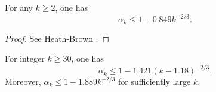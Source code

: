 \begin{lemma}\label{hb-alpha-large}
For any $k \ge 2$, one has
\[
\alpha_k \le 1 - 0.849k^{-2/3}.
\]
\end{lemma}
\begin{proof}
See Heath-Brown \cite{heathbrown_new_2017}.
\end{proof}

\begin{theorem}For integer $k \ge 30$, one has
\[
\alpha_k \leq 1 - 1.421(k - 1.18)^{-2/3}.
\]
Moreover, $\alpha_k \leq 1 - 1.889k^{-2/3}$ for sufficiently large $k$.
\end{theorem}